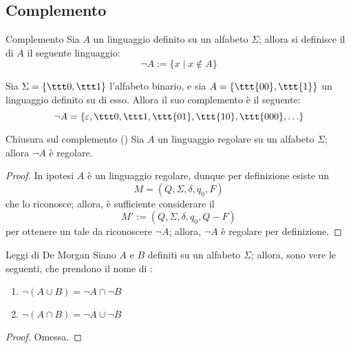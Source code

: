 \documentclass[a4paper, 12pt]{report}
\begin{document}
    \subsection{Complemento}

    \begin{frameddefn}{Complemento}
        Sia $A$ un linguaggio definito su un alfabeto $\Sigma$; allora si definisce il  di $A$ il seguente linguaggio: $$\lnot A := \{x \mid x \notin A\}$$
    \end{frameddefn}

    \begin{example}[Complemento]
        Sia $\Sigma = \{\ttt 0, \ttt 1\}$ l'alfabeto binario, e sia $A = \{ \ttt{00}, \ttt{1}\}$ un linguaggio definito su di esso. Allora il suo complemento è il seguente: $$\lnot A = \{\varepsilon, \ttt 0, \ttt 1, \ttt{01}, \ttt{10}, \ttt{000}, \ldots\}$$
    \end{example}

    \begin{framedprop}[label={closure compl}]{Chiusura sul complemento (\REG)}
        Sia $A$ un linguaggio regolare su un alfabeto $\Sigma$; allora $\lnot A$ è regolare.
    \end{framedprop}

    \begin{proof}
        In ipotesi $A$ è un linguaggio regolare, dunque per definizione esiste un \DFA $$M = (Q, \Sigma, \delta, q_0, F)$$ che lo riconosce; allora, è sufficiente considerare il \DFA $$M' := (Q, \Sigma, \delta, q_0, Q-F)$$ per ottenere un \DFA tale da riconoscere $\lnot A$; allora, $\lnot A$ è regolare per definizione.
    \end{proof}

    \begin{framedprop}{Leggi di De Morgan}
        Siano $A$ e $B$ definiti su un alfabeto $\Sigma$; allora, sono vere le seguenti, che prendono il nome di :

        \begin{enumerate}[label=\roman*), font=\itshape]
            \item $\lnot (A \cup B) = \lnot A \cap \lnot B$
            \item $\lnot (A \cap B) = \lnot A \cup \lnot B$
        \end{enumerate}
    \end{framedprop}

    \begin{proof}
        Omessa.
    \end{proof}
\end{document}

